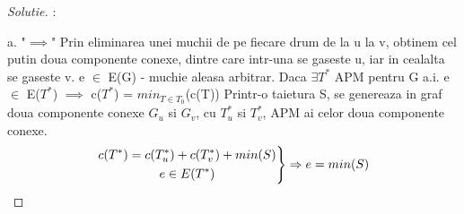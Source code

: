 \documentclass[12pt]{article}
\newenvironment{rcases}
 {\left.\begin{aligned}}
 	{\end{aligned}\right\rbrace}
\begin{document}
\begin{proof}[Solutie]:\newline

a. \newline
"$\implies$" \newline
Prin eliminarea unei muchii de pe fiecare drum de la u la v, obtinem cel putin doua componente conexe, dintre care intr-una se gaseste u, iar in cealalta se gaseste v.
\newline
e $\in$ E(G) - muchie aleasa arbitrar.
\newline
Daca $\exists$$T^*$ APM pentru G a.i. e $\in$ E($T^*$) $\implies$ c($T^*$) = $min_{T\in T_0 }$(c(T))
\newline
Printr-o taietura S, se genereaza in graf doua componente conexe $G_u$ si $G_v$, cu $T_u^*$ si $T_v^*$, APM ai celor doua componente conexe.
\newline
\[
\begin{rcases}
\begin{gathered}
c(T^*) = c(T_u^*) + c(T_v^*) + min(S)\\
e \in E(T^*)
\end{gathered} \end{rcases} \Rightarrow \begin{gathered}
e = min(S)
\end{gathered}
\]


\end{proof}
\end{document}

